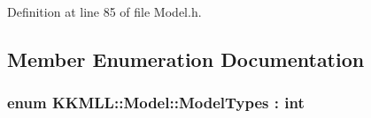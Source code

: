 Definition at line 85 of file Model.\+h.



\subsection{Member Enumeration Documentation}
\subsubsection[{\texorpdfstring{Model\+Types}{ModelTypes}}]{\setlength{\rightskip}{0pt plus 5cm}enum {\bf K\+K\+M\+L\+L\+::\+Model\+::\+Model\+Types} \+: int\hspace{0.3cm}{\ttfamily [strong]}}\hypertarget{class_k_k_m_l_l_1_1_model_aeda4060e088c67446ca993eefcecea06}{}\label{class_k_k_m_l_l_1_1_model_aeda4060e088c67446ca993eefcecea06}
